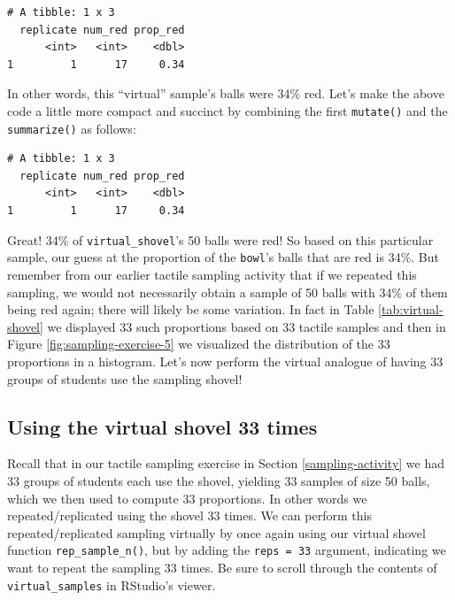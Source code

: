 \documentclass[12pt, krantz2,]{krantz}
\makeatletter
\newenvironment{Shaded}{\begin{snugshade}}{\end{snugshade}}
\newcommand{\DataTypeTok}[1]{\textcolor[rgb]{0.27,0.27,0.27}{#1}}
\newcommand{\DecValTok}[1]{\textcolor[rgb]{0.06,0.06,0.06}{#1}}
\newcommand{\KeywordTok}[1]{\textcolor[rgb]{0.27,0.27,0.27}{\textbf{#1}}}
\newcommand{\NormalTok}[1]{#1}
\newcommand{\OperatorTok}[1]{\textcolor[rgb]{0.43,0.43,0.43}{\textbf{#1}}}
\newcommand{\StringTok}[1]{\textcolor[rgb]{0.5,0.5,0.5}{#1}}
\newenvironment{kframe}{%
\medskip{}
\setlength{\fboxsep}{.8em}
 \def\at@end@of@kframe{}%
 \ifinner\ifhmode%
  \def\at@end@of@kframe{\end{minipage}}%
  \begin{minipage}{\columnwidth}%
 \fi\fi%
 \def\FrameCommand##1{\hskip\@totalleftmargin \hskip-\fboxsep
 \colorbox{shadecolor}{##1}\hskip-\fboxsep
     \hskip-\linewidth \hskip-\@totalleftmargin \hskip\columnwidth}%
 \MakeFramed {\advance\hsize-\width
   \@totalleftmargin\z@ \linewidth\hsize
   \@setminipage}}%
 {\par\unskip\endMakeFramed%
 \at@end@of@kframe}
\renewenvironment{Shaded}{\begin{kframe}}{\end{kframe}}
\makeatother
\begin{document}
\begin{verbatim}
# A tibble: 1 x 3
  replicate num_red prop_red
      <int>   <int>    <dbl>
1         1      17     0.34
\end{verbatim}

In other words, this ``virtual'' sample's balls were 34\% red. Let's make the above code a little more compact and succinct by combining the first \texttt{mutate()} and the \texttt{summarize()} as follows:

\begin{Shaded}
\end{Shaded}

\begin{verbatim}
# A tibble: 1 x 3
  replicate num_red prop_red
      <int>   <int>    <dbl>
1         1      17     0.34
\end{verbatim}

Great! 34\% of \texttt{virtual\_shovel}'s 50 balls were red! So based on this particular sample, our guess at the proportion of the \texttt{bowl}'s balls that are red is 34\%. But remember from our earlier tactile sampling activity that if we repeated this sampling, we would not necessarily obtain a sample of 50 balls with 34\% of them being red again; there will likely be some variation. In fact in Table \ref{tab:virtual-shovel} we displayed 33 such proportions based on 33 tactile samples and then in Figure \ref{fig:sampling-exercise-5} we visualized the distribution of the 33 proportions in a histogram. Let's now perform the virtual analogue of having 33 groups of students use the sampling shovel!

\hypertarget{using-the-virtual-shovel-33-times}{%
\subsection{Using the virtual shovel 33 times}\label{using-the-virtual-shovel-33-times}}

Recall that in our tactile sampling exercise in Section \ref{sampling-activity} we had 33 groups of students each use the shovel, yielding 33 samples of size 50 balls, which we then used to compute 33 proportions. In other words we repeated/replicated using the shovel 33 times. We can perform this repeated/replicated sampling virtually by once again using our virtual shovel function \texttt{rep\_sample\_n()}, but by adding the \texttt{reps\ =\ 33} argument, indicating we want to repeat the sampling 33 times. Be sure to scroll through the contents of \texttt{virtual\_samples} in RStudio's viewer.
\end{document}
